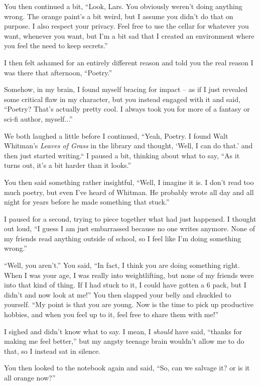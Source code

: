 You then continued a bit, ``Look, Lars. You obviously weren't doing anything wrong.
The orange paint's a bit weird, but I assume you didn't do that on purpose.
I also respect your privacy.
Feel free to use the cellar for whatever you want, whenever you want, but I'm a bit sad that I created an environment where you feel the need to keep secrets.''

I then felt ashamed for an entirely different reason and told you the real reason I was there that afternoon, ``Poetry.''

Somehow, in my brain, I found myself bracing for impact -- as if I just revealed some critical flaw in my character, but you instead engaged with it and said,
``Poetry? That's actually pretty cool. I always took you for more of a fantasy or sci-fi author, myself...''

We both laughed a little before I continued, ``Yeah, Poetry. I found Walt Whitman's \textit{Leaves of Grass} in the library and thought, `Well, I can do that.' and then just started writing.`` I paused a bit, thinking about what to say, ``As it turns out, it's a bit harder than it looks.''

You then said something rather insightful, ``Well, I imagine it is. I don't read too much poetry, but even I've heard of Whitman. He probably wrote all day and all night for years before he made something that stuck.''

I paused for a second, trying to piece together what had just happened.
I thought out loud, ``I guess I am just embarrassed because no one writes anymore.
None of my friends read anything outside of school, so I feel like I'm doing something wrong.''

``Well, you aren't.'' You said, ``In fact, I think you are doing something right.
When I was your age, I was really into weightlifting, but none of my friends were into that kind of thing.
If I had stuck to it, I could have gotten a 6 pack, but I didn't and now look at me!''
You then slapped your belly and chuckled to yourself.
``My point is that you are young. Now is the time to pick up productive hobbies, and when you feel up to it, feel free to share them with me!''

I sighed and didn't know what to say.
I mean, I \textit{should} have said, ``thanks for making me feel better,'' but my angsty teenage brain wouldn't allow me to do that, so I instead sat in silence.

You then looked to the notebook again and said, ``So, can we salvage it? or is it all orange now?''

